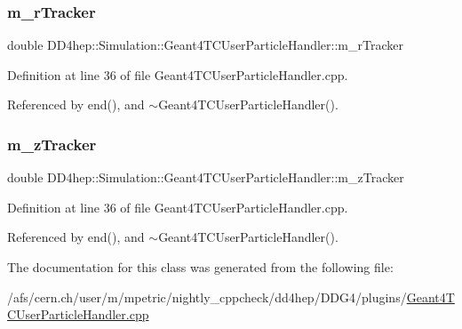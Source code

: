\subsubsection{\texorpdfstring{m\+\_\+r\+Tracker}{m\_rTracker}}
{\footnotesize\ttfamily double D\+D4hep\+::\+Simulation\+::\+Geant4\+T\+C\+User\+Particle\+Handler\+::m\+\_\+r\+Tracker\hspace{0.3cm}{\ttfamily [private]}}



Definition at line 36 of file Geant4\+T\+C\+User\+Particle\+Handler.\+cpp.



Referenced by end(), and $\sim$\+Geant4\+T\+C\+User\+Particle\+Handler().

\hypertarget{class_d_d4hep_1_1_simulation_1_1_geant4_t_c_user_particle_handler_a79695432f91c1c1d7430f26e6a365a40}{}\label{class_d_d4hep_1_1_simulation_1_1_geant4_t_c_user_particle_handler_a79695432f91c1c1d7430f26e6a365a40} 
\subsubsection{\texorpdfstring{m\+\_\+z\+Tracker}{m\_zTracker}}
{\footnotesize\ttfamily double D\+D4hep\+::\+Simulation\+::\+Geant4\+T\+C\+User\+Particle\+Handler\+::m\+\_\+z\+Tracker\hspace{0.3cm}{\ttfamily [private]}}



Definition at line 36 of file Geant4\+T\+C\+User\+Particle\+Handler.\+cpp.



Referenced by end(), and $\sim$\+Geant4\+T\+C\+User\+Particle\+Handler().



The documentation for this class was generated from the following file\+:\begin{DoxyCompactItemize}
\item 
/afs/cern.\+ch/user/m/mpetric/nightly\+\_\+cppcheck/dd4hep/\+D\+D\+G4/plugins/\hyperlink{_geant4_t_c_user_particle_handler_8cpp}{Geant4\+T\+C\+User\+Particle\+Handler.\+cpp}\end{DoxyCompactItemize}
